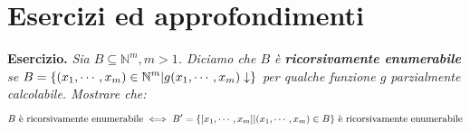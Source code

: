 
\section{Esercizi ed approfondimenti}

\textbf{Esercizio. } \textit{Sia \(B \subseteq \mathbb{N}^m, m > 1\). Diciamo che \(B\) è \textbf{ricorsivamente enumerabile} se \(B=\displaystyle{\left\{{(x_1,\cdots, x_m) \in \mathbb{N}^m \vert g(x_1, \cdots, x_m)\downarrow}\right\}}\) per qualche funzione \(g\) parzialmente calcolabile. Mostrare che:}
\begin{equation}
    \label{Riduzione a N per ricorsivamente enumerabili}
    B \text{ è ricorsivamente enumerabile} \iff B'=\displaystyle{\left\{{[x_1, \cdots, x_m] \vert (x_1, \cdots, x_m) \in B }\right\}} \text{ è ricorsivamente enumerabile}
\end{equation}

